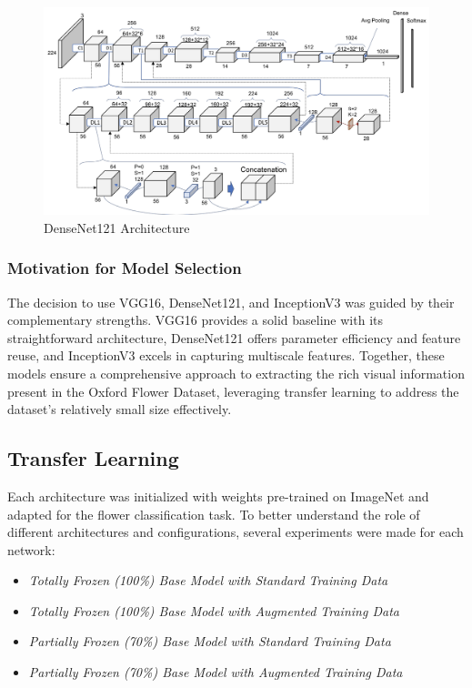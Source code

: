 \begin{figure}[h!]
    \centering
    \includegraphics[width=.75\linewidth]{Images/Densenet121}
    \caption{DenseNet121 Architecture}
\end{figure}

\vspace{0.3cm}

\subsubsection*{Motivation for Model Selection}
The decision to use VGG16, DenseNet121, and InceptionV3 was guided by their complementary strengths. VGG16 provides a
solid baseline with its straightforward architecture, DenseNet121 offers parameter efficiency and feature reuse, and
InceptionV3 excels in capturing multiscale features. Together, these models ensure a comprehensive approach to extracting the rich
visual information present in the Oxford Flower Dataset, leveraging transfer learning to address the dataset's relatively
small size effectively.

\subsection{Transfer Learning}

Each architecture was initialized with weights pre-trained on ImageNet and adapted for the flower classification task.
To better understand the role of different architectures and configurations, several experiments were made for each network:

\begin{itemize}
    \item \textit{Totally Frozen (100\%) Base Model with Standard Training Data}
    \item \textit{Totally Frozen (100\%) Base Model with Augmented Training Data}
    \item \textit{Partially Frozen (70\%) Base Model with Standard Training Data}
    \item \textit{Partially Frozen (70\%) Base Model with Augmented Training Data}
\end{itemize}

